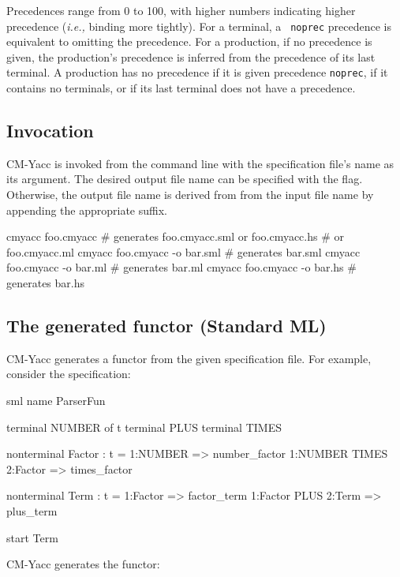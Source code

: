 \documentclass[10pt]{article}
\begin{document}
\begin{strictcode}
\begin{strictcode}
\begin{strictcode}
\begin{strictcode}
\begin{strictcode}
\begin{strictcode}
\begin{strictcode}
Precedences range from 0 to 100, with higher numbers indicating higher
precedence ({\em i.e.,} binding more tightly).  For a terminal, a {\tt
noprec} precedence is equivalent to omitting the precedence.  For a
production, if no precedence is given, the production's precedence is
inferred from the precedence of its last terminal.  A production has no precedence
if it is given precedence {\tt noprec}, if it contains no terminals,
or if its last terminal does not have a precedence.



\subsection{Invocation}

CM-Yacc is invoked from the command line with the specification file's
name as its argument.  The desired output file name can be specified
with the  flag.  Otherwise, the output file name is derived from from
the input file name by appending the appropriate suffix.

\begin{code}
cmyacc foo.cmyacc               # generates foo.cmyacc.sml or foo.cmyacc.hs
                                #   or foo.cmyacc.ml
cmyacc foo.cmyacc -o bar.sml    # generates bar.sml
cmyacc foo.cmyacc -o bar.ml     # generates bar.ml
cmyacc foo.cmyacc -o bar.hs     # generates bar.hs
\end{code}



\subsection{The generated functor (Standard ML)}
\label{sec:yacc-functor-sml}

CM-Yacc generates a functor from the given specification file.  For example,
consider the specification:

\begin{code}
sml
name ParserFun

terminal NUMBER of t
terminal PLUS
terminal TIMES

nonterminal Factor : t =
  1:NUMBER => number_factor
  1:NUMBER TIMES 2:Factor => times_factor

nonterminal Term : t =
  1:Factor => factor_term
  1:Factor PLUS 2:Term => plus_term

start Term
\end{code}

CM-Yacc generates the functor:


\end{strictcode}
\end{strictcode}
\end{strictcode}
\end{strictcode}
\end{strictcode}
\end{strictcode}
\end{strictcode}
\end{document}
